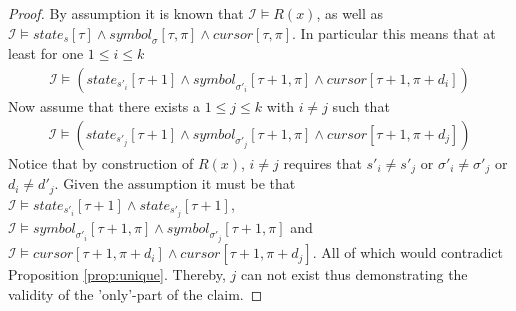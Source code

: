 \documentclass [11pt]{article}
\newcommand{\nmodels}{\not\models}
\newcommand{\sym}[3]{\textit{symbol}_{#1}[#2,#3]}
\newcommand{\cursor}[2]{\textit{cursor}[#1,#2]}
\newcommand{\state}[2]{\textit{state}_{#1}[#2]}
\begin{document}
\begin{proof}
By assumption it is known that $\mathcal{I} \models R(x)$,  as well as $\mathcal{I} \models \state{s}{\tau} \wedge \sym{\sigma}{\tau}{\pi} \wedge \cursor{\tau}{\pi}$. In particular this means that at least for one $1 \leq i \leq k$  
\begin{equation*}
\begin{split}
\mathcal{I} \models ({\state{s'_i}{\tau+1}}\wedge \sym{\sigma'_i}{\tau+1}{\pi} \wedge {\cursor{\tau+1}{\pi+d_i}} )
\end{split}
\end{equation*}
Now assume that there exists a  $1 \leq j \leq k$  with $i\neq j$ such that 
\begin{equation*}
\begin{split}
\mathcal{I} \models ({\state{s'_j}{\tau+1}}\wedge \sym{\sigma'_j}{\tau+1}{\pi} \wedge {\cursor{\tau+1}{\pi+d_j}} )
\end{split}
\end{equation*}
Notice that by construction of $R(x)$,  $i\neq j$ requires that  $s'_i \neq s'_j $ or $ \sigma'_i \neq \sigma'_j $  or $ d_i\neq d'_j $. 
Given the assumption it must be that $\mathcal{I} \models \state{s'_i}{\tau+1} \land  \state{s'_j}{\tau+1} $,  $\mathcal{I} \models  \sym{\sigma'_i}{\tau+1}{\pi} \land \sym{\sigma'_j}{\tau+1}{\pi} $  and 
$\mathcal{I} \models \cursor{\tau+1}{\pi+d_i} \land \cursor{\tau+1}{\pi+d_j}$. All of which would contradict Proposition \ref{prop:unique}. 
Thereby, $j$ can not exist thus demonstrating the validity of the 'only'-part of the claim.
%
\end{proof}
\end{document}
